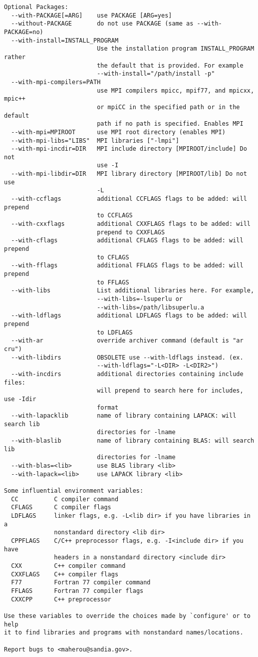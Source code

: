 \begin{Verbatim}
Optional Packages:
  --with-PACKAGE[=ARG]    use PACKAGE [ARG=yes]
  --without-PACKAGE       do not use PACKAGE (same as --with-PACKAGE=no)
  --with-install=INSTALL_PROGRAM
                          Use the installation program INSTALL_PROGRAM rather
                          the default that is provided. For example
                          --with-install="/path/install -p"
  --with-mpi-compilers=PATH
                          use MPI compilers mpicc, mpif77, and mpicxx, mpic++
                          or mpiCC in the specified path or in the default
                          path if no path is specified. Enables MPI
  --with-mpi=MPIROOT      use MPI root directory (enables MPI)
  --with-mpi-libs="LIBS"  MPI libraries ["-lmpi"]
  --with-mpi-incdir=DIR   MPI include directory [MPIROOT/include] Do not
                          use -I
  --with-mpi-libdir=DIR   MPI library directory [MPIROOT/lib] Do not use
                          -L
  --with-ccflags          additional CCFLAGS flags to be added: will prepend
                          to CCFLAGS
  --with-cxxflags         additional CXXFLAGS flags to be added: will
                          prepend to CXXFLAGS
  --with-cflags           additional CFLAGS flags to be added: will prepend
                          to CFLAGS
  --with-fflags           additional FFLAGS flags to be added: will prepend
                          to FFLAGS
  --with-libs             List additional libraries here. For example,
                          --with-libs=-lsuperlu or
                          --with-libs=/path/libsuperlu.a
  --with-ldflags          additional LDFLAGS flags to be added: will prepend
                          to LDFLAGS
  --with-ar               override archiver command (default is "ar cru")
  --with-libdirs          OBSOLETE use --with-ldflags instead. (ex.
                          --with-ldflags="-L<DIR> -L<DIR2>")
  --with-incdirs          additional directories containing include files:
                          will prepend to search here for includes, use -Idir
                          format
  --with-lapacklib        name of library containing LAPACK: will search lib
                          directories for -lname
  --with-blaslib          name of library containing BLAS: will search lib
                          directories for -lname
  --with-blas=<lib>       use BLAS library <lib>
  --with-lapack=<lib>     use LAPACK library <lib>

Some influential environment variables:
  CC          C compiler command
  CFLAGS      C compiler flags
  LDFLAGS     linker flags, e.g. -L<lib dir> if you have libraries in a
              nonstandard directory <lib dir>
  CPPFLAGS    C/C++ preprocessor flags, e.g. -I<include dir> if you have
              headers in a nonstandard directory <include dir>
  CXX         C++ compiler command
  CXXFLAGS    C++ compiler flags
  F77         Fortran 77 compiler command
  FFLAGS      Fortran 77 compiler flags
  CXXCPP      C++ preprocessor

Use these variables to override the choices made by `configure' or to help
it to find libraries and programs with nonstandard names/locations.

Report bugs to <maherou@sandia.gov>.
\end{Verbatim}
